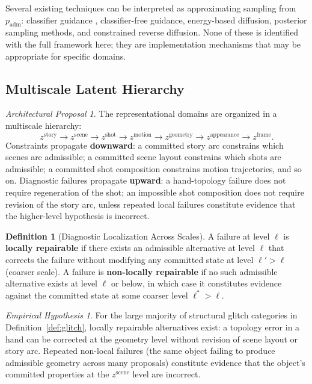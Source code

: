 \documentclass[11pt,a4paper]{article}
\theoremstyle{plain}
\theoremstyle{definition}
\newtheorem{definition}[theorem]{Definition}
\theoremstyle{remark}
\newtheorem{hypothesis}[theorem]{Empirical Hypothesis}
\newtheorem{proposal}[theorem]{Architectural Proposal}
\begin{document}
Several existing techniques can be interpreted as approximating sampling from $p_{\mathrm{adm}}$: classifier guidance \cite{dhariwal2021diffusion}, classifier-free guidance, energy-based diffusion, posterior sampling methods, and constrained reverse diffusion. None of these is identified with the full framework here; they are implementation mechanisms that may be appropriate for specific domains.

\subsection{Multiscale Latent Hierarchy}

\begin{proposal}
The representational domains are organized in a multiscale hierarchy:
\[
z^{\mathrm{story}} \to z^{\mathrm{scene}} \to z^{\mathrm{shot}} \to z^{\mathrm{motion}} \to z^{\mathrm{geometry}} \to z^{\mathrm{appearance}} \to z^{\mathrm{frame}}.
\]
Constraints propagate \textbf{downward}: a committed story arc constrains which scenes are admissible; a committed scene layout constrains which shots are admissible; a committed shot composition constrains motion trajectories, and so on. Diagnostic failures propagate \textbf{upward}: a hand-topology failure does not require regeneration of the shot; an impossible shot composition does not require revision of the story arc, unless repeated local failures constitute evidence that the higher-level hypothesis is incorrect.
\end{proposal}

\begin{definition}[Diagnostic Localization Across Scales]
A failure at level $\ell$ is \textbf{locally repairable} if there exists an admissible alternative at level $\ell$ that corrects the failure without modifying any committed state at level $\ell' > \ell$ (coarser scale). A failure is \textbf{non-locally repairable} if no such admissible alternative exists at level $\ell$ or below, in which case it constitutes evidence against the committed state at some coarser level $\ell^* > \ell$.
\end{definition}

\begin{hypothesis}
\label{hyp:localrepair}
For the large majority of structural glitch categories in Definition~\ref{def:glitch}, locally repairable alternatives exist: a topology error in a hand can be corrected at the geometry level without revision of scene layout or story arc. Repeated non-local failures (the same object failing to produce admissible geometry across many proposals) constitute evidence that the object's committed properties at the $z^{\mathrm{scene}}$ level are incorrect.
\end{hypothesis}
\end{document}
